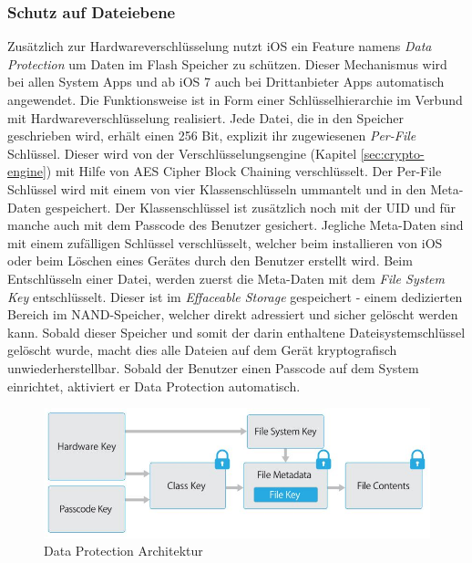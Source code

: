 	\subsubsection{Schutz auf Dateiebene}\label{sec:filesecurity}
		Zusätzlich zur Hardwareverschlüsselung nutzt iOS ein Feature namens \textsl{Data
		Protection} um Daten im Flash Speicher zu schützen. Dieser Mechanismus
		wird bei allen System Apps und ab iOS 7 auch bei Drittanbieter Apps
		automatisch angewendet. Die Funktionsweise ist in Form einer
		Schlüsselhierarchie im Verbund mit Hardwareverschlüsselung realisiert. Jede
		Datei, die in den Speicher geschrieben wird, erhält einen 256 Bit, explizit
		ihr zugewiesenen \textsl{Per-File} Schlüssel. Dieser wird von der
		Verschlüsselungsengine (Kapitel \ref{sec:crypto-engine}) mit Hilfe von
		AES Cipher Block Chaining verschlüsselt. Der Per-File Schlüssel wird mit
		einem von vier Klassenschlüsseln ummantelt und in den Meta-Daten gespeichert.
		Der Klassenschlüssel ist zusätzlich noch mit der UID und für manche auch mit
		dem Passcode des Benutzer gesichert. Jegliche Meta-Daten sind mit einem
		zufälligen Schlüssel verschlüsselt, welcher beim installieren von iOS oder
		beim Löschen eines Gerätes durch den Benutzer erstellt wird. Beim
		Entschlüsseln einer Datei, werden zuerst die Meta-Daten mit dem \textsl{File
		System Key} entschlüsselt. Dieser ist im \textsl{Effaceable Storage}
		gespeichert - einem dedizierten Bereich im NAND-Speicher, welcher direkt
		adressiert und sicher gelöscht werden kann.
		Sobald dieser Speicher und somit der darin enthaltene Dateisystemschlüssel
		gelöscht wurde, macht dies alle Dateien auf dem Gerät kryptografisch
		unwiederherstellbar. Sobald der Benutzer einen Passcode auf dem System
		einrichtet, aktiviert er Data Protection automatisch.
		\begin{figure}[h]
			\centering
			\includegraphics[width=0.9\linewidth]{ios/media/data-protection.jpg}
			\caption{Data Protection Architektur 
			\cite[S.10]{iOSSecurityApr2015}}
			\label{fig:data-protection}
		\end{figure}
